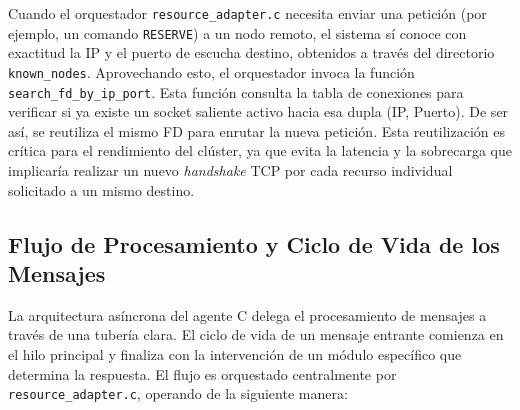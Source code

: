\documentclass[12pt,a4paper]{article}
\begin{document}
Cuando el orquestador \texttt{resource\_adapter.c} necesita enviar una petición (por ejemplo, un comando \texttt{RESERVE}) a un nodo remoto, el sistema sí conoce con exactitud la IP y el puerto de escucha destino, obtenidos a través del directorio \texttt{known\_nodes}. Aprovechando esto, el orquestador invoca la función \texttt{search\_fd\_by\_ip\_port}. Esta función consulta la tabla de conexiones para verificar si ya existe un socket saliente activo hacia esa dupla (IP, Puerto). De ser así, se reutiliza el mismo FD para enrutar la nueva petición. Esta reutilización es crítica para el rendimiento del clúster, ya que evita la latencia y la sobrecarga que implicaría realizar un nuevo \emph{handshake} TCP por cada recurso individual solicitado a un mismo destino.

\subsection{Flujo de Procesamiento y Ciclo de Vida de los Mensajes}

La arquitectura asíncrona del agente C delega el procesamiento de mensajes a través de una tubería clara. El ciclo de vida de un mensaje entrante comienza en el hilo principal y finaliza con la intervención de un módulo específico que determina la respuesta. El flujo es orquestado centralmente por \texttt{resource\_adapter.c}, operando de la siguiente manera:
\end{document}
